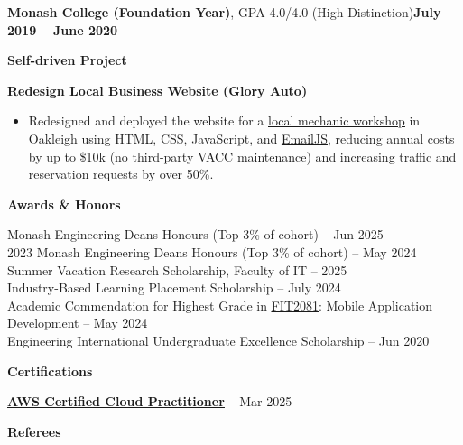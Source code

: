 \documentclass[11pt, a4paper]{article}
\let\hrefnoul\href
\renewcommand{\href}[2]{\hrefnoul{#1}{\ul{#2}}}
\newcommand{\resumesection}[1]{%
  \vspace{6pt}\par
  {\setlength{\fboxsep}{5pt}%
   \noindent\colorbox{sectionbg}{%
     \parbox{\dimexpr\linewidth-10pt\relax}{\strut\textbf{\large #1}\strut}%
   }}%
  \vspace{2pt}\par
}
\begin{document}
\vspace{4pt}
\noindent\textbf{Monash College (Foundation Year)}, GPA 4.0/4.0 (High Distinction)\hfill\textbf{July 2019 – June 2020}

\resumesection{Self-driven Project}

\vspace{4pt}
\noindent\textbf{Redesign Local Business Website
(\href{https://www.gloryauto.com.au/}{Glory Auto})}

\begin{itemize}[leftmargin=1.5em, itemsep=2pt, topsep=1pt, parsep=0pt]
  \item Redesigned and deployed the website for a
        \href{https://github.com/JayReeMarine/Mechanic-Workshop-Page}{local mechanic workshop} in
        Oakleigh using HTML, CSS, JavaScript, and \href{https://www.emailjs.com}{EmailJS}, reducing
        annual costs by up to \$10k (no third-party VACC maintenance) and increasing traffic and
        reservation requests by over 50\%.
\end{itemize}

\resumesection{Awards \& Honors}

\vspace{4pt}
 Monash Engineering Deans Honours (Top 3\% of cohort) – Jun 2025\\
2023 Monash Engineering Deans Honours (Top 3\% of cohort) – May 2024\\
Summer Vacation Research Scholarship, Faculty of IT – 2025\\
Industry-Based Learning Placement Scholarship – July 2024\\
Academic Commendation for Highest Grade in
\href{https://handbook.monash.edu/2024/units/FIT2081}{FIT2081}:
Mobile Application Development – May 2024\\
Engineering International Undergraduate Excellence Scholarship – Jun 2020

\resumesection{Certifications}

\vspace{4pt}
\noindent\href{https://aws.amazon.com/certification/certified-cloud-practitioner/}{\textbf{AWS Certified Cloud Practitioner}}
– Mar 2025

\resumesection{Referees}
\end{document}
